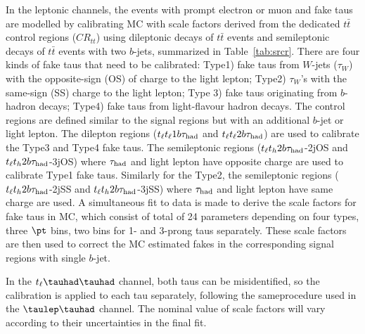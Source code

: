 In the leptonic channels, the events with prompt electron or muon and fake taus are modelled by calibrating MC with scale factors
derived from the dedicated $t\bar t$
control regions ($CR_{tt}$) using dileptonic decays of $t\bar t$ events and semileptonic decays of $t\bar t$ events with two
$b$-jets, summarized in Table~\ref{tab:srcr}. 	
There are four kinds of fake taus that need to be calibrated: Type1) fake taus from $W$-jets ($\tau_{W}$)
with the opposite-sign (OS) of charge to the light lepton;
Type2) $\tau_{W}$'s with the same-sign (SS) charge to the light lepton; Type 3) fake taus originating from $b$-hadron decays; Type4) fake taus from light-flavour hadron decays.
The control regions are defined similar to the signal regions but with an additional $b$-jet or light lepton.
The dilepton regions ($t_{\ell}t_{\ell}1b\tau_\text{had}$ and $t_{\ell}t_{\ell}2b\tau_\text{had}$) are used to calibrate the Type3 and Type4 fake taus. The semileptonic
regions ($t_{\ell}t_h2b\tau_\text{had}$-2jOS and $t_{\ell}t_h2b\tau_\text{had}$-3jOS) where $\tau_\text{had}$ and light lepton have opposite charge are used to calibrate Type1 fake taus.
Similarly for the Type2, the semileptonic regions ($t_{\ell}t_h2b\tau_\text{had}$-2jSS and $t_{\ell}t_h2b\tau_\text{had}$-3jSS) where $\tau_\text{had}$ and light lepton have same charge are used.
A simultaneous fit to data is made to derive the scale factors for fake taus in MC, which consist of total of 24 parameters
depending on four types, three $\pt$ bins, two bins for 1- and 3-prong taus separately.
These scale factors are then used to correct the MC estimated fakes in the corresponding  signal regions with single $b$-jet.

In the $t_{\ell}\thadhad$ channel, both taus can be misidentified, so the calibration is applied to each tau separately, following the sameprocedure used in the $\tlhad$ channel.
The nominal value of scale factors will vary according to their uncertainties in the final fit.

